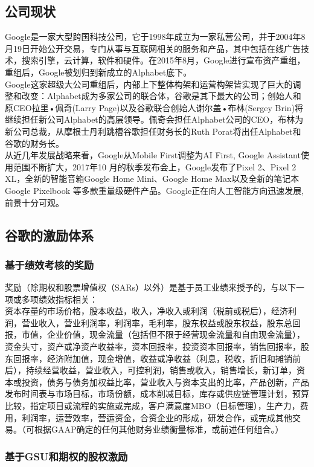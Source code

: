 \documentclass{article}
\begin{document}
\begin{CJK}{UTF8}{gbsn}
\subsection{公司现状}
Google是一家大型跨国科技公司，它于1998年成立为一家私营公司，并于2004年8月19日开始公开交易，专门从事与互联网相关的服务和产品，其中包括在线广告技术，搜索引擎，云计算，软件和硬件。在2015年8月，Google进行宣布资产重组，重组后，Google被划归到新成立的Alphabet底下。\\Google这家超级大公司重组后，内部上下整体构架和运营构架皆实现了巨大的调整和改变：Alphabet成为多家公司的联合体，谷歌是其下最大的公司；创始人和原CEO拉里•佩奇(Larry Page)以及谷歌联合创始人谢尔盖•布林(Sergey Brin)将继续担任新公司Alphabet的高层领导。佩奇会担任Alphabet公司的CEO，布林为新公司总裁，从摩根士丹利跳槽谷歌担任财务长的Ruth Porat将出任Alphabet和谷歌的财务长。\\从近几年发展战略来看，Google从Mobile First调整为AI First, Google Assistant使用范围不断扩大，2017年10 月的秋季发布会上，Google发布了Pixel 2、Pixel 2 XL，全新的智能音箱Google Home Mini、Google Home Max以及全新的笔记本Google Pixelbook 等多款重量级硬件产品。Google正在向人工智能方向迅速发展,前景十分可观。

\subsection{谷歌的激励体系}
\subsubsection{基于绩效考核的奖励}
奖励（除期权和股票增值权（SARs）以外）是基于员工业绩来授予的，与以下一项或多项绩效指标相关：\\
资本存量的市场价格，股本收益，收入，净收入或利润（税前或税后），经济利润，营业收入，营业利润率，利润率，毛利率，股东权益或股东权益，股东总回报，市值，企业价值，现金流量（包括但不限于经营现金流量和自由现金流量），资金头寸，资产或净资产收益率，资本回报率，投资资本回报率，销售回报率，股东回报率，经济附加值，现金增值，收益或净收益（利息，税收，折旧和摊销前后），持续经营收益，营业收入，可控利润，销售或收入，销售增长，新订单，资本或投资，债务与债务加权益比率，营业收入与资本支出的比率，产品创新，产品发布时间表与市场目标，市场份额，成本削减目标，库存或供应链管理计划，预算比较，指定项目或流程的实施或完成，客户满意度MBO（目标管理），生产力，费用，利润率，运营效率，营运资金，合资企业的形成，研发合作，或完成其他交易。（可根据GAAP确定的任何其他财务业绩衡量标准，或前述任何组合。）
\subsubsection{基于GSU和期权的股权激励}

\end{CJK}
\end{document}
